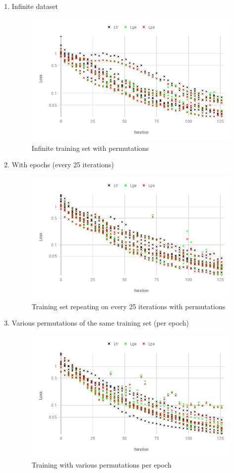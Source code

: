 \begin{enumerate}[label=(\Alph*)]

        \item Infinite dataset
        
        \begin{figure}[!htb]
            \centering
            \includegraphics[width=.45\linewidth]{fig/content/results/shortest_path/training_perm.png}
            \caption{Infinite training set with permutations}
            \label{fig:shotest_paths_train_perm_results}
        \end{figure}
        
        \item With epochs (every 25 iterations)
        
        \begin{figure}[!htb]
            \centering
            \includegraphics[width=.45\linewidth]{fig/content/results/shortest_path/epochs_perm.png}
            \caption{Training set repeating on every 25 iterations with permutations}
            \label{fig:shotest_paths_epochs_perm_results}
        \end{figure}
        
        \item Various permutations of the same training set (per epoch)
        
        \begin{figure}[!htb]
            \centering
            \includegraphics[width=.45\linewidth]{fig/content/results/shortest_path/various_perms_per_epoch.png}
            \caption{Training with various permutations per epoch}
            \label{fig:shotest_paths_varios_perms_results}
        \end{figure}

    \end{enumerate}
    
